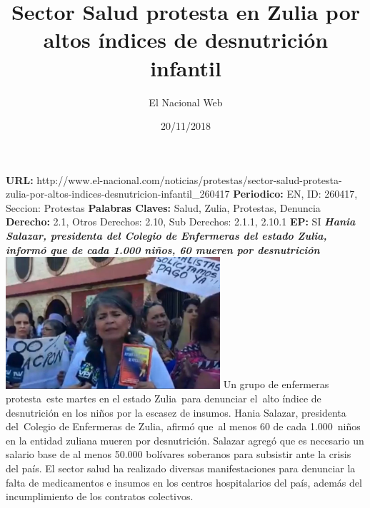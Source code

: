 \documentclass{article}%
\title{\textbf{Sector Salud protesta en Zulia por altos índices de desnutrición infantil}}%
\author{El Nacional Web}%
\date{20/11/2018}%
\begin{document}
%
\normalsize%
\maketitle%
\textbf{URL: }%
http://www.el{-}nacional.com/noticias/protestas/sector{-}salud{-}protesta{-}zulia{-}por{-}altos{-}indices{-}desnutricion{-}infantil\_260417\newline%
%
\textbf{Periodico: }%
EN, %
ID: %
260417, %
Seccion: %
Protestas\newline%
%
\textbf{Palabras Claves: }%
Salud, Zulia, Protestas, Denuncia\newline%
%
\textbf{Derecho: }%
2.1, %
Otros Derechos: %
2.10, %
Sub Derechos: %
2.1.1, 2.10.1\newline%
%
\textbf{EP: }%
SI\newline%
\newline%
%
\textbf{\textit{Hania Salazar, presidenta del Colegio de Enfermeras del estado Zulia, informó que de cada 1.000 niños, 60 mueren por desnutrición}}%
\newline%
\newline%
%
\includegraphics[width=300px]{71.jpg}%
\newline%
%
Un grupo de enfermeras protesta~este martes en el estado Zulia~para denunciar el~alto índice de desnutrición en los niños por la escasez de insumos.%
\newline%
%
Hania Salazar, presidenta del~Colegio de Enfermeras de Zulia, afirmó que~al menos 60 de cada 1.000~niños en la entidad zuliana mueren por desnutrición.%
\newline%
%
Salazar agregó que es necesario un salario base de al menos 50.000 bolívares soberanos para subsistir ante la crisis del país.%
\newline%
%
El sector salud ha realizado diversas manifestaciones para denunciar la falta de medicamentos e insumos en los centros hospitalarios del país, además del incumplimiento de los contratos colectivos.%
\newline%
%
\end{document}
